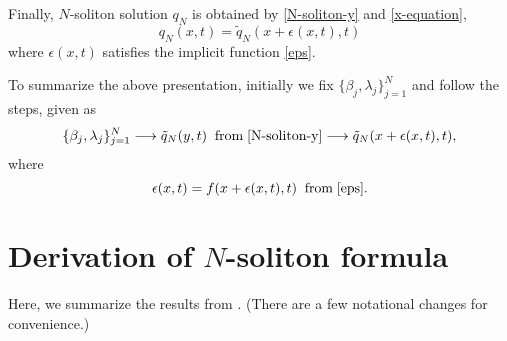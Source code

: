 \documentclass[11pt]{article}
\begin{document}
Finally, $N$-soliton solution $q_{N}$ is obtained by \eqref{N-soliton-y} and \eqref{x-equation},
\begin{equation} \label{q-N}
q_N(x,t)=\tilde{q}_N(x+\epsilon(x,t),t)
\end{equation}
where $\epsilon(x,t)$ satisfies the implicit function \eqref{eps}.

To summarize the above presentation, initially we fix $\{\beta_j,\lambda_j\}_{j=1}^N$ and follow the steps, given as  
$$\{\beta_j,\lambda_j\}_{j=1}^N \longrightarrow \tilde{q}_N(y,t)\;\; \mbox{from}\; \eqref{N-soliton-y} 
 \longrightarrow \tilde{q}_N(x+\epsilon(x,t),t),$$
 where
 $$ \epsilon(x,t) = f(x+\epsilon(x,t),t) \;\; \mbox{from}\; \eqref{eps}.$$
 
 







 
\section{Derivation of $N$-soliton formula} \label{Riemann-Hilbert-section}
Here, we summarize the results from \cite{Shimabukuro-present}. (There are a few notational changes for convenience.) 
\end{document}
